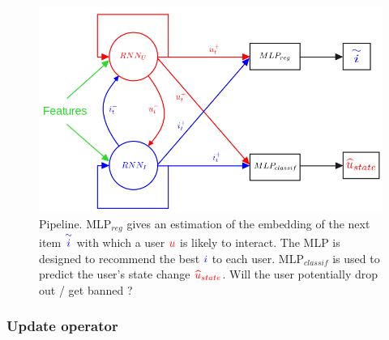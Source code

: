 \begin{figure}[H]
   \begin{center}
        \includegraphics[scale = 0.4]{image/pipeline.png}
    \end{center}
    \caption{Pipeline. $\text{MLP}_{reg}$ gives an estimation of the embedding of the next item $\textcolor{blue}{\overset{\sim}{i}}$ with which a user $\textcolor{red}{u}$ is likely to interact. The MLP  is designed to recommend the best $\textcolor{blue}{i}$ to each user. $\text{MLP}_{classif}$ is used to predict the user's state change $\textcolor{red}{\widehat u_{state}}$. Will the user potentially drop out / get banned ?}
    \label{Pipeline}
\end{figure}

\subsubsection{Update operator}

